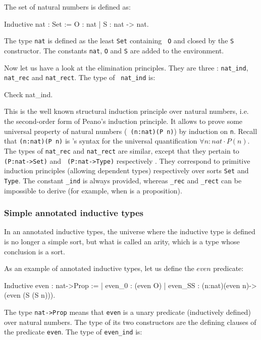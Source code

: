 The set of natural numbers is defined as:
\begin{coq_example}
Inductive nat : Set := O : nat | S : nat -> nat.
\end{coq_example}

The type {\tt nat} is defined as the least \verb:Set: containing {\tt
  O} and closed by the {\tt S} constructor. The constants {\tt nat},
{\tt O} and {\tt S} are added to the environment.

Now let us have a look at the elimination principles. They are three :
{\tt nat\_ind}, {\tt nat\_rec} and {\tt nat\_rect}.  The type of {\tt
  nat\_ind} is:
\begin{coq_example}
Check nat_ind.
\end{coq_example}

This is the well known structural induction principle over natural
numbers, i.e. the second-order form of Peano's induction principle.
It allows to prove some universal property of natural numbers ({\tt
(n:nat)(P n)}) by induction on {\tt n}. Recall that {\tt (n:nat)(P n)}
is \gallina's syntax for the universal quantification $\forall
n:nat\cdot P(n).$\\ The types of {\tt nat\_rec} and {\tt nat\_rect}
are similar, except that they pertain to {\tt (P:nat->Set)} and {\tt
(P:nat->Type)} respectively . They correspond to primitive induction
principles (allowing dependent types) respectively over sorts
\verb:Set: and \verb:Type:. The constant {\ident}{\tt \_ind} is always
provided, whereas {\ident}{\tt \_rec} and {\ident}{\tt \_rect} can be
impossible to derive (for example, when {\ident} is a proposition).

\subsubsection{Simple annotated inductive types}

In an annotated inductive types, the universe where the inductive
type is defined is no longer a simple sort, but what is called an
arity, which is a type whose conclusion is a sort.

As an example of annotated inductive types, let us define the
$even$ predicate:

\begin{coq_example}
Inductive even : nat->Prop :=
 | even_0  : (even O)
 | even_SS : (n:nat)(even n)->(even (S (S n))).
\end{coq_example}

The type {\tt nat->Prop} means that {\tt even} is a unary predicate
(inductively defined) over natural numbers.  The type of its two
constructors are the defining clauses of the predicate {\tt even}. The
type of {\tt even\_ind} is:

